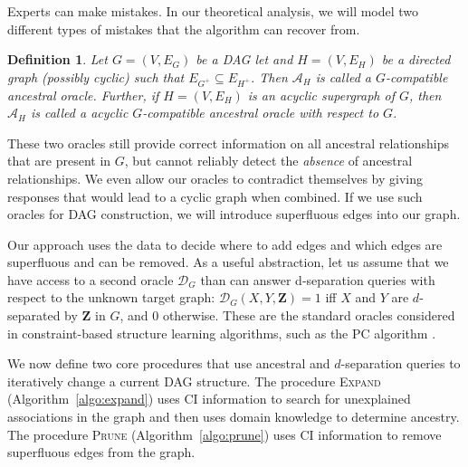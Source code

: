 \documentclass[accepted]{uai2025} %
\newtheorem{definition}{Definition}
\begin{document}
Experts can make mistakes. In our theoretical analysis, we will model two different types
of mistakes that the algorithm can recover from. 

\begin{definition}
Let $G=(V,E_G)$ be a DAG let and $H=(V,E_H)$ be a directed graph (possibly cyclic) 
such that $E_{G^+} \subseteq E_{H^+}$. Then $\mathcal{A}_H$
is called a \emph{$G$-compatible ancestral oracle}. Further, 
if $H=(V,E_H)$ is an acyclic supergraph of $G$, then 
$\mathcal{A}_H$ is called a \emph{acyclic $G$-compatible ancestral oracle} with respect to $G$.
\end{definition}

These two oracles still provide correct information on all ancestral relationships that are 
present in $G$, but cannot reliably detect the \emph{absence} of ancestral relationships.
We even allow our oracles to contradict themselves by giving responses that would lead to a 
cyclic graph when combined. If we use such oracles for DAG construction, we will
introduce superfluous edges into our graph.

Our approach uses the data to decide where to add edges and which edges 
are superfluous and can be removed.
As a useful abstraction, let us assume that we
have access to a second oracle $\mathcal{D}_G$ than can answer d-separation
queries with respect to the unknown target graph:
$\mathcal{D}_G(X,Y,\mathbf{Z})=1$ iff $X$ and $Y$ are $d$-separated by $\mathbf{Z}$ in 
$G$, and $0$ otherwise. These are the standard oracles considered in constraint-based structure
learning algorithms, such as the PC algorithm \citep{Spirtes2001}. 

We now define two core procedures that use ancestral and $d$-separation queries
to iteratively change a current DAG structure. The procedure 
\textsc{Expand} (Algorithm~\ref{algo:expand}) uses CI  
information to search for unexplained associations in the graph and 
then uses domain knowledge to determine ancestry. The 
procedure \textsc{Prune} (Algorithm~\ref{algo:prune}) uses
CI information to remove superfluous edges from the
graph.
\end{document}
